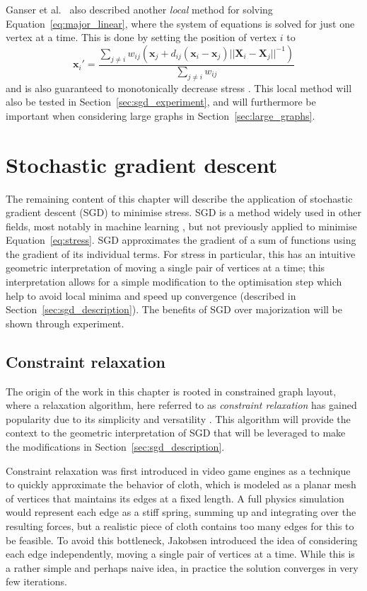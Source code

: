 Ganser et al.\ \cite{Gansner2004} also described another \emph{local} method for solving Equation~\ref{eq:major_linear}, where the system of equations is solved for just one vertex at a time. This is done by setting the position of vertex $i$ to
\begin{equation}
  \mathbf{x}_i' = \frac{\sum_{j\neq i}w_{ij}(\mathbf{x}_j + d_{ij}(\mathbf{x}_i - \mathbf{x}_j)||\mathbf{X}_i - \mathbf{X}_j||^{-1})}{\sum_{j\neq i}w_{ij}}
  \label{eq:major_local}
\end{equation}
and is also guaranteed to monotonically decrease stress \cite{Gansner2004}. This local method will also be tested in Section~\ref{sec:sgd_experiment}, and will furthermore be important when considering large graphs in Section~\ref{sec:large_graphs}.

\section{Stochastic gradient descent}
\label{sec:sgd}
The remaining content of this chapter will describe the application of stochastic gradient descent (SGD) to minimise stress. SGD is a method widely used in other fields, most notably in machine learning \cite{Bottou2012}, but not previously applied to minimise Equation~\ref{eq:stress}. 
SGD approximates the gradient of a sum of functions using the gradient of its individual terms. For stress in particular, this has an intuitive geometric interpretation of moving a single pair of vertices at a time; this interpretation allows for a simple modification to the optimisation step which help to avoid local minima and speed up convergence (described in Section~\ref{sec:sgd_description}). The benefits of SGD over majorization will be shown through experiment.

\subsection{Constraint relaxation}
\label{sec:wcr_story}
The origin of the work in this chapter is rooted in constrained graph layout, where a relaxation algorithm, here referred to as \emph{constraint relaxation} has gained popularity due to its simplicity and versatility \cite{Dwyer2009,Bostock2011}. This algorithm will provide the context to the geometric interpretation of SGD that will be leveraged to make the modifications in Section~\ref{sec:sgd_description}.

Constraint relaxation was first introduced in video game engines as a technique to quickly approximate the behavior of cloth, which is modeled as a planar mesh of vertices that maintains its edges at a fixed length.
A full physics simulation would represent each edge as a stiff spring, summing up and integrating over the resulting forces, but a realistic piece of cloth contains too many edges for this to be feasible.
To avoid this bottleneck, Jakobsen \cite{Jakobsen2001} introduced the idea of considering each edge independently, moving a single pair of vertices at a time.
While this is a rather simple and perhaps naive idea, in practice the solution converges in very few iterations.

